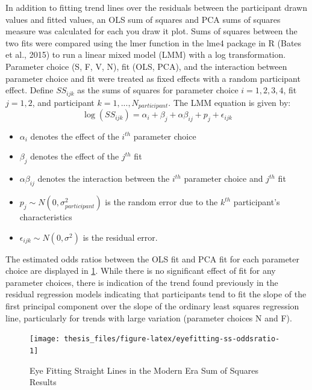 \documentclass[print]{nuthesis}
\providecommand{\tightlist}{%
  \setlength{\itemsep}{0pt}\setlength{\parskip}{0pt}}
\begin{document}
In addition to fitting trend lines over the residuals between the participant drawn values and fitted values, an OLS sum of squares and PCA sums of squares measure was calculated for each you draw it plot.
Sums of squares between the two fits were compared using the lmer function in the lme4 package in R (Bates et al., 2015) to run a linear mixed model (LMM) with a log transformation.
Parameter choice (S, F, V, N), fit (OLS, PCA), and the interaction between parameter choice and fit were treated as fixed effects with a random participant effect.
Define \(SS_{ijk}\) as the sums of squares for parameter choice \(i = 1,2,3,4\), fit \(j=1,2\), and participant \(k = 1,...,N_{participant}\).
The LMM equation is given by:
\begin{equation}
\log\left(SS_{ijk}\right) = \alpha_i + \beta_j + \alpha\beta_{ij} + p_{j} + \epsilon_{ijk}
\end{equation}

\begin{itemize}
\tightlist
\item
  \(\alpha_i\) denotes the effect of the \(i^{th}\) parameter choice
\item
  \(\beta_j\) denotes the effect of the \(j^{th}\) fit
\item
  \(\alpha\beta_{ij}\) denotes the interaction between the \(i^{th}\) parameter choice and \(j^{th}\) fit
\item
  \(p_{j} \sim N(0, \sigma^2_{participant})\) is the random error due to the \(k^{th}\) participant's characteristics
\item
  \(\epsilon_{ijk} \sim N(0, \sigma^2)\) is the residual error.
\end{itemize}

The estimated odds ratios between the OLS fit and PCA fit for each parameter choice are displayed in \cref{fig:eyefitting-ss-oddsratio}.
While there is no significant effect of fit for any parameter choices, there is indication of the trend found previously in the residual regression models indicating that participants tend to fit the slope of the first principal component over the slope of the ordinary least squares regression line, particularly for trends with large variation (parameter choices N and F).

\begin{figure}[tbp]

{\centering \texttt{[image: thesis\_files/figure-latex/eyefitting-ss-oddsratio-1]} 

}

\caption{Eye Fitting Straight Lines in the Modern Era Sum of Squares Results}\label{fig:eyefitting-ss-oddsratio}
\end{figure}
\end{document}
